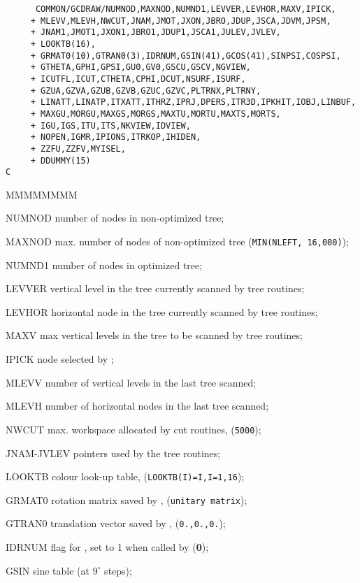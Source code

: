 \begin{verbatim}
      COMMON/GCDRAW/NUMNOD,MAXNOD,NUMND1,LEVVER,LEVHOR,MAXV,IPICK,
     + MLEVV,MLEVH,NWCUT,JNAM,JMOT,JXON,JBRO,JDUP,JSCA,JDVM,JPSM,
     + JNAM1,JMOT1,JXON1,JBRO1,JDUP1,JSCA1,JULEV,JVLEV,
     + LOOKTB(16),
     + GRMAT0(10),GTRAN0(3),IDRNUM,GSIN(41),GCOS(41),SINPSI,COSPSI,
     + GTHETA,GPHI,GPSI,GU0,GV0,GSCU,GSCV,NGVIEW,
     + ICUTFL,ICUT,CTHETA,CPHI,DCUT,NSURF,ISURF,
     + GZUA,GZVA,GZUB,GZVB,GZUC,GZVC,PLTRNX,PLTRNY,
     + LINATT,LINATP,ITXATT,ITHRZ,IPRJ,DPERS,ITR3D,IPKHIT,IOBJ,LINBUF,
     + MAXGU,MORGU,MAXGS,MORGS,MAXTU,MORTU,MAXTS,MORTS,
     + IGU,IGS,ITU,ITS,NKVIEW,IDVIEW,
     + NOPEN,IGMR,IPIONS,ITRKOP,IHIDEN,
     + ZZFU,ZZFV,MYISEL,
     + DDUMMY(15)
C
\end{verbatim}
\begin{DLtt}{MMMMMMMM}
\item[NUMNOD] number of nodes in non-optimized tree;
\item[MAXNOD] max. number of nodes of non-optimized tree
({\tt MIN(NLEFT, 16,000)});
\item[NUMND1] number of nodes in optimized tree;
\item[LEVVER] vertical level in the tree currently scanned by tree routines;
\item[LEVHOR] horizontal node in the tree currently scanned by
tree routines;
\item[MAXV] max vertical levels in the tree to be scanned by tree routines;
\item[IPICK] node selected by ;
\item[MLEVV] number of vertical levels in the last tree scanned;
\item[MLEVH] number of horizontal nodes in the last tree scanned;
\item[NWCUT] max. workspace allocated by cut routines, ({\tt 5000});
\item[JNAM-JVLEV]  pointers used by the tree routines;
\item[LOOKTB] colour look-up table, ({\tt LOOKTB(I)=I,I=1,16});
\item[GRMAT0] rotation matrix saved by , ({\tt unitary matrix});
\item[GTRAN0] translation vector saved by , ({\tt 0.,0.,0.});
\item[IDRNUM] flag for , set to 1 when called by 
({\bf 0});
\item[GSIN] sine table (at $9^{\circ}$ steps);

\end{DLtt}
